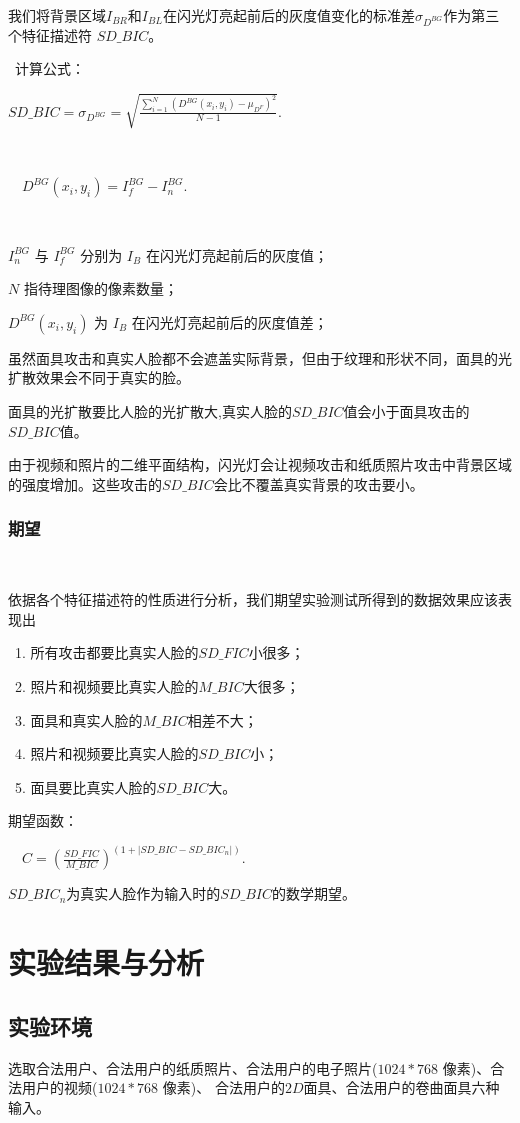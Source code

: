 \documentclass[conference]{IEEEtran}
\begin{document}
我们将背景区域$I_{BR}$和$I_{BL}$在闪光灯亮起前后的灰度值变化的标准差$\sigma_{D^{BG}}$作为第三个特征描述符 $SD \_ BIC$。

\ 
计算公式：

{$SD \_ BIC = \sigma_{D^{BG}} = \displaystyle\sqrt{\frac{\sum_{i=1}^{N}{(D^{BG}(x_i,y_i)-\mu_{D^{F}})}^{2}}{N-1}}.$}

\ 

\ \ {$D^{BG}(x_i,y_i) = I_f^{BG} - I_n^{BG}.$}

\ 

$I_n^{BG}$ 与 $I_f^{BG}$ 分别为 $I_B$ 在闪光灯亮起前后的灰度值；

$N$ 指待理图像的像素数量；

$D^{BG}(x_i,y_i)$ 为 $I_B$ 在闪光灯亮起前后的灰度值差；

虽然面具攻击和真实人脸都不会遮盖实际背景，但由于纹理和形状不同，面具的光扩散效果会不同于真实的脸。

面具的光扩散要比人脸的光扩散大,真实人脸的$SD \_ BIC$值会小于面具攻击的$SD \_ BIC$值。

由于视频和照片的二维平面结构，闪光灯会让视频攻击和纸质照片攻击中背景区域的强度增加。这些攻击的$SD \_ BIC$会比不覆盖真实背景的攻击要小。

\subsubsection{期望}
\ 

依据各个特征描述符的性质进行分析，我们期望实验测试所得到的数据效果应该表现出

\ 1. 所有攻击都要比真实人脸的$SD \_ FIC$小很多；

\ 2. 照片和视频要比真实人脸的$M \_ BIC$大很多；

\ 3. 面具和真实人脸的$M \_ BIC$相差不大；

\ 4. 照片和视频要比真实人脸的$SD \_ BIC$小；

\ 5. 面具要比真实人脸的$SD \_ BIC$大。

期望函数：

\ \ ${C = \displaystyle(\frac{SD \_ FIC}{M \_ BIC})^{(1+\left | SD \_ BIC-SD \_ BIC_n \right|)}.}$

$SD \_ BIC_n$为真实人脸作为输入时的$SD \_ BIC$的数学期望。

\section{实验结果与分析}
\subsection{实验环境}
选取合法用户、合法用户的纸质照片、合法用户的电子照片($1024*768$ 像素)、合法用户的视频($1024*768$ 像素)、
合法用户的$2D$面具、合法用户的卷曲面具六种输入。
\end{document}
